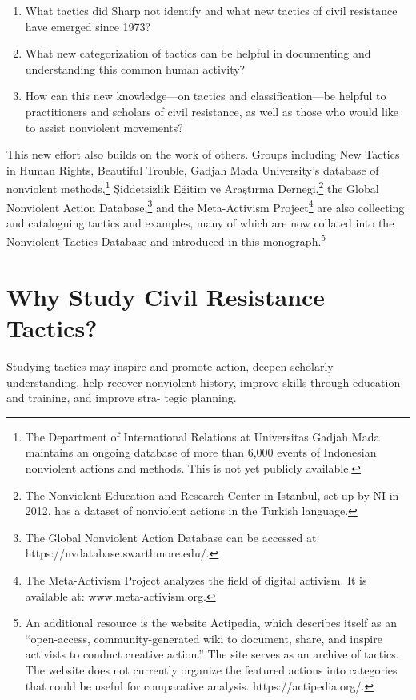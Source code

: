 \documentclass[twoside,a4paper,12pt,fleqn,openany]{extbook}
\begin{document}
\begin{enumerate}
\item What tactics did Sharp not identify and what new tactics of civil resistance have emerged since 1973?
\item What new categorization of tactics can be helpful in documenting and understanding this common human activity?
\item How can this new knowledge—on tactics and classification—be helpful to practitioners and scholars of civil resistance, as well as those who would like to assist nonviolent movements?
\end{enumerate}

This new effort also builds on the work of others. Groups including New Tactics in Human Rights, Beautiful Trouble, Gadjah Mada University’s database of nonviolent methods,\footnote{The Department of International Relations at Universitas Gadjah Mada maintains an ongoing database of more than 6,000 events of Indonesian nonviolent actions and methods. This is not yet publicly available.} Şiddetsizlik Eğitim ve Araştırma Dernegi,\footnote{The Nonviolent Education and Research Center in Istanbul, set up by NI in 2012, has a dataset of nonviolent actions in the Turkish language.} the Global Nonviolent Action Database,\footnote{The Global Nonviolent Action Database can be accessed at: https://nvdatabase.swarthmore.edu/.} and the Meta-Activism Project\footnote{The Meta-Activism Project analyzes the field of digital activism. It is available at: www.meta-activism.org.} are also collecting and cataloguing tactics and examples, many of which are now collated into the Nonviolent Tactics Database and introduced in this monograph.\footnote{An additional resource is the website Actipedia, which describes itself as an “open-access, community-generated wiki to document, share, and inspire activists to conduct creative action.” The site serves as an archive of tactics. The website does not currently organize the featured actions into categories that could be useful for comparative analysis. https://actipedia.org/.}

\section*{Why Study Civil Resistance Tactics?}

Studying tactics may inspire and promote action, deepen scholarly understanding, help
recover nonviolent history, improve skills through education and training, and improve stra-
tegic planning.
\end{document}
